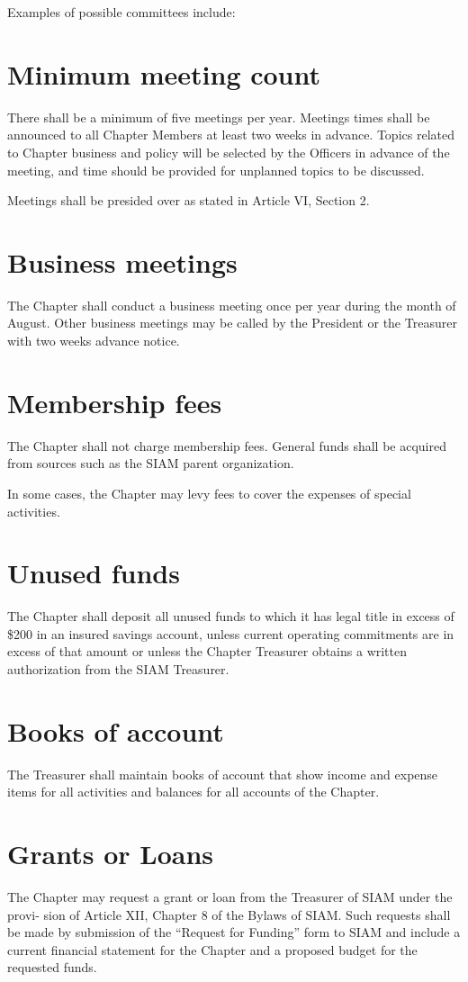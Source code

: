 \documentclass{ronr-bylaws}
\begin{document}
Examples of possible committees include:
\lipsum[7]
%
\section{Minimum meeting count}
There shall be a minimum of five meetings per year. Meetings times shall be announced
to all Chapter Members at least two weeks in advance. Topics related to Chapter business and
policy will be selected by the Officers in advance of the meeting, and time should be provided for
unplanned topics to be discussed.

Meetings shall be presided over as stated in Article VI, Section 2.

\section{Business meetings}
The Chapter shall conduct a business meeting once per year during the month of
August. Other business meetings may be called by the President or the Treasurer with two weeks
advance notice.
%
\section{Membership fees}
The Chapter shall not charge membership fees. General funds shall be acquired from
sources such as the SIAM parent organization.

In some cases, the Chapter may levy fees to cover the expenses of special activities.

\section{Unused funds}
The Chapter shall deposit all unused funds to which it has legal title in excess of \$200
in an insured savings account, unless current operating commitments are in excess of that amount
or unless the Chapter Treasurer obtains a written authorization from the SIAM Treasurer.

\section{Books of account}
The Treasurer shall maintain books of account that show income and expense items
for all activities and balances for all accounts of the Chapter.

\section{Grants or Loans}
The Chapter may request a grant or loan from the Treasurer of SIAM under the provi-
sion of Article XII, Chapter 8 of the Bylaws of SIAM. Such requests shall be made by submission of
the ``Request for Funding'' form to SIAM and include a current financial statement for the Chapter
and a proposed budget for the requested funds.
\end{document}
